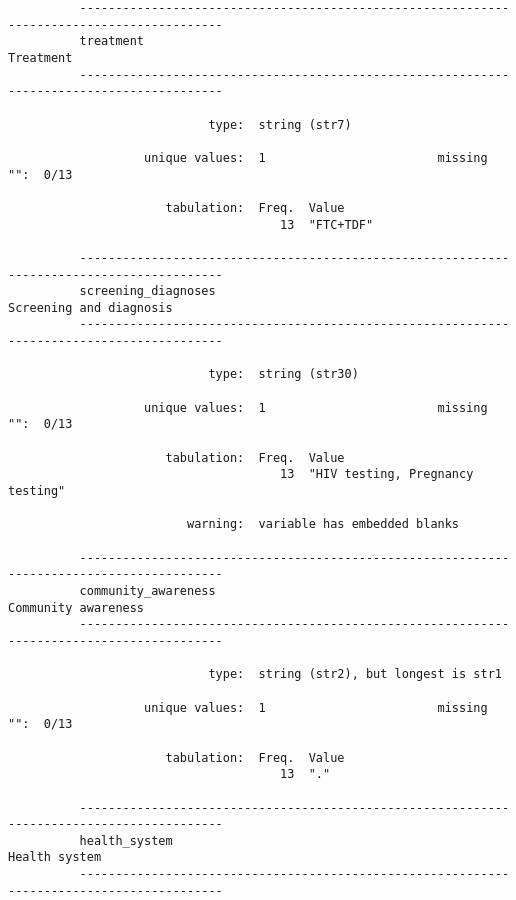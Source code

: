 \documentclass{article}
\begin{document}
\begin{verbatim}
          ------------------------------------------------------------------------------------------
          treatment                                                                        Treatment
          ------------------------------------------------------------------------------------------
          
                            type:  string (str7)
          
                   unique values:  1                        missing "":  0/13
          
                      tabulation:  Freq.  Value
                                      13  "FTC+TDF"
          
          ------------------------------------------------------------------------------------------
          screening_diagnoses                                                Screening and diagnosis
          ------------------------------------------------------------------------------------------
          
                            type:  string (str30)
          
                   unique values:  1                        missing "":  0/13
          
                      tabulation:  Freq.  Value
                                      13  "HIV testing, Pregnancy testing"
          
                         warning:  variable has embedded blanks
          
          ------------------------------------------------------------------------------------------
          community_awareness                                                    Community awareness
          ------------------------------------------------------------------------------------------
          
                            type:  string (str2), but longest is str1
          
                   unique values:  1                        missing "":  0/13
          
                      tabulation:  Freq.  Value
                                      13  "."
          
          ------------------------------------------------------------------------------------------
          health_system                                                                Health system
          ------------------------------------------------------------------------------------------
          

\end{verbatim}
\end{document}
